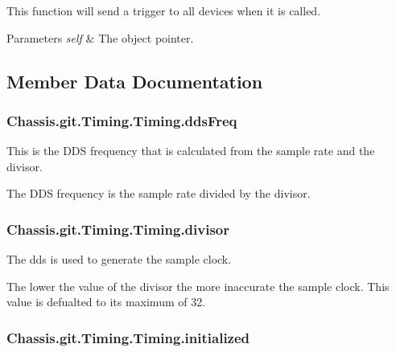 This function will send a trigger to all devices when it is called. 


\begin{DoxyParams}{Parameters}
{\em self} & The object pointer. \\
\hline
\end{DoxyParams}


\subsection{Member Data Documentation}
\hypertarget{class_chassis_8git_1_1_timing_1_1_timing_a6d07dfa513f351c6e1f8ccd283439207}{
\subsubsection[{dds\-Freq}]{\setlength{\rightskip}{0pt plus 5cm}Chassis.\-git.\-Timing.\-Timing.\-dds\-Freq}}\label{class_chassis_8git_1_1_timing_1_1_timing_a6d07dfa513f351c6e1f8ccd283439207}


This is the D\-D\-S frequency that is calculated from the sample rate and the divisor. 

The D\-D\-S frequency is the sample rate divided by the divisor. \hypertarget{class_chassis_8git_1_1_timing_1_1_timing_aaaf0df2e649cc66725ef0578a9b4ad39}{
\subsubsection[{divisor}]{\setlength{\rightskip}{0pt plus 5cm}Chassis.\-git.\-Timing.\-Timing.\-divisor}}\label{class_chassis_8git_1_1_timing_1_1_timing_aaaf0df2e649cc66725ef0578a9b4ad39}


The dds is used to generate the sample clock. 

The lower the value of the divisor the more inaccurate the sample clock. This value is defualted to its maximum of 32. \hypertarget{class_chassis_8git_1_1_timing_1_1_timing_adb8c3cb047beca2237a36edf1ea42432}{
\subsubsection[{initialized}]{\setlength{\rightskip}{0pt plus 5cm}Chassis.\-git.\-Timing.\-Timing.\-initialized}}\label{class_chassis_8git_1_1_timing_1_1_timing_adb8c3cb047beca2237a36edf1ea42432}


